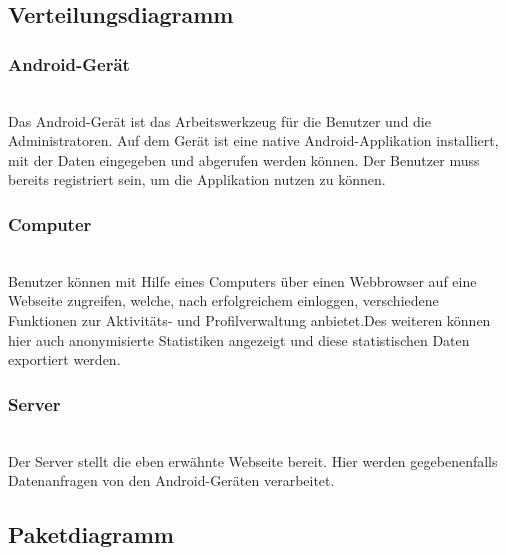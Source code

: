 \subsection{Verteilungsdiagramm}

\subsubsection{Android-Gerät}\\
Das Android-Gerät ist das Arbeitswerkzeug für die Benutzer und die Administratoren. Auf dem Gerät ist eine native Android-Applikation installiert, mit der Daten eingegeben und abgerufen werden können. Der Benutzer muss bereits registriert sein, um die Applikation nutzen zu können.\\
\subsubsection{Computer}\\
Benutzer können mit Hilfe eines Computers über einen Webbrowser auf eine Webseite zugreifen, welche, nach erfolgreichem einloggen, verschiedene Funktionen zur Aktivitäts- und Profilverwaltung anbietet.Des weiteren können hier auch anonymisierte Statistiken angezeigt und diese statistischen Daten exportiert werden.\\
\subsubsection{Server}\\
Der Server stellt die eben erwähnte Webseite bereit. Hier werden gegebenenfalls Datenanfragen von den Android-Geräten verarbeitet.\\
\subsection{Paketdiagramm}